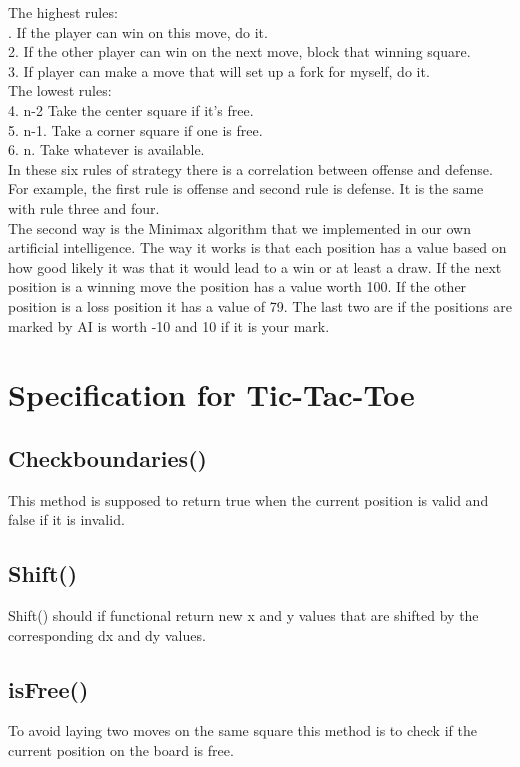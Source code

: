 \documentclass[a4paper,10pt]{article}
\begin{document}
	The highest rules:\\
	. If the player can win on this move, do it. \\
	2. If the other player can win on the next move, block that winning square.\\
	3. If player can make a move that will set up a fork for myself, do it.\\
	The lowest rules:\\
	4. n-2 Take the center square if it’s free.\\
	5. n-1. Take a corner square if one is free. \\
	6. n. Take whatever is available.\\
	\newline
	In these six rules of strategy there is a correlation between offense and defense. For example, the first rule is offense and second rule is defense. It is the same with rule three and four. \\
	The second way is the Minimax algorithm that we implemented in our own artificial intelligence. The way it works is that each position has a value based on how good likely it was that it would lead to a win or at least a draw. If the next position is a winning move the position has a value worth 100. If the other position is a loss position it has a value of 79. The last two are if the positions are marked by AI is worth -10 and 10 if it is your mark. \\
	
	
	\section{Specification for Tic-Tac-Toe} 
	\subsection{Checkboundaries()}
	This method is supposed to return true when the current position is valid and false if it is invalid.
	\subsection{Shift()}
	Shift() should if functional return new x and y values that are shifted by the corresponding dx and dy values.
	\subsection{isFree()}
	To avoid laying two moves on the same square this method is to check if the current position on the board is free.
\end{document}
